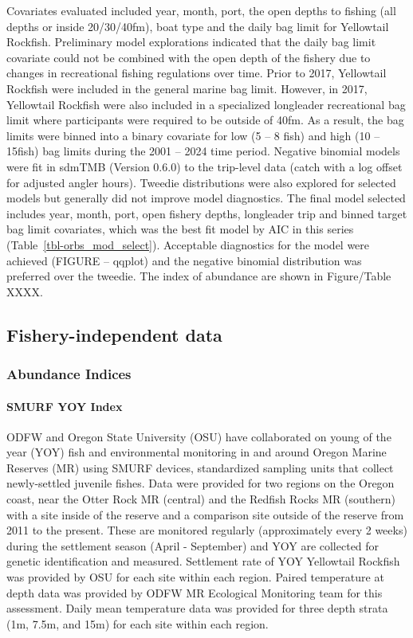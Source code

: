 \documentclass[
]{scrartcl}
\let\oldparagraph\paragraph
\renewcommand{\paragraph}[1]{\oldparagraph{#1}\mbox{}}
\begin{document}
Covariates evaluated included year, month, port, the open depths to
fishing (all depths or inside 20/30/40fm), boat type and the daily bag
limit for Yellowtail Rockfish. Preliminary model explorations indicated
that the daily bag limit covariate could not be combined with the open
depth of the fishery due to changes in recreational fishing regulations
over time. Prior to 2017, Yellowtail Rockfish were included in the
general marine bag limit. However, in 2017, Yellowtail Rockfish were
also included in a specialized longleader recreational bag limit where
participants were required to be outside of 40fm. As a result, the bag
limits were binned into a binary covariate for low (5 -- 8 fish) and
high (10 -- 15fish) bag limits during the 2001 -- 2024 time period.
Negative binomial models were fit in sdmTMB (Version 0.6.0) to the
trip-level data (catch with a log offset for adjusted angler hours).
Tweedie distributions were also explored for selected models but
generally did not improve model diagnostics. The final model selected
includes year, month, port, open fishery depths, longleader trip and
binned target bag limit covariates, which was the best fit model by AIC
in this series (Table~\ref{tbl-orbs_mod_select}). Acceptable diagnostics
for the model were achieved (FIGURE -- qqplot) and the negative binomial
distribution was preferred over the tweedie. The index of abundance are
shown in Figure/Table XXXX.

\subsection{Fishery-independent data}\label{fishery-independent-data}

\subsubsection{Abundance Indices}\label{abundance-indices-1}

\paragraph{SMURF YOY Index}\label{smurf-yoy-index}

ODFW and Oregon State University (OSU) have collaborated on young of the
year (YOY) fish and environmental monitoring in and around Oregon Marine
Reserves (MR) using SMURF devices, standardized sampling units that
collect newly-settled juvenile fishes. Data were provided for two
regions on the Oregon coast, near the Otter Rock MR (central) and the
Redfish Rocks MR (southern) with a site inside of the reserve and a
comparison site outside of the reserve from 2011 to the present. These
are monitored regularly (approximately every 2 weeks) during the
settlement season (April - September) and YOY are collected for genetic
identification and measured. Settlement rate of YOY Yellowtail Rockfish
was provided by OSU for each site within each region. Paired temperature
at depth data was provided by ODFW MR Ecological Monitoring team for
this assessment. Daily mean temperature data was provided for three
depth strata (1m, 7.5m, and 15m) for each site within each region.
\end{document}
